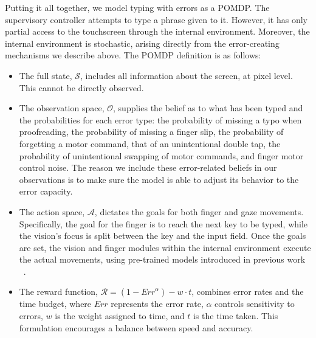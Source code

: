 Putting it all together, we model typing with errors as a POMDP.
The supervisory controller attempts to type a phrase given to it.
However, it has only partial access to the touchscreen through the internal environment. 
Moreover, the internal environment is stochastic, arising directly from the error-creating mechanisms we describe above.
The POMDP definition is as follows:
\begin{itemize}
    \item The full state, $\mathcal{S}$, includes all information about the screen, at pixel level. This cannot be directly observed.
    \item The observation space, $\mathcal{O}$, supplies the belief as to what has been typed and the probabilities for each error type: the probability of missing a typo when proofreading, the probability of missing a finger slip, the probability of forgetting a motor command, that of an unintentional double tap, the probability of unintentional swapping of motor commands, and finger motor control noise. The reason we include these error-related beliefs in our observations is to make sure the model is able to adjust its behavior to the error capacity.
    \item The action space, $\mathcal{A}$, dictates the goals for both finger and gaze movements. Specifically, the goal for the finger is to reach the next key to be typed, while the vision's focus is split between the key and the input field. Once the goals are set, the vision and finger modules within the internal environment execute the actual movements, using pre-trained models introduced in previous work ~\cite{shi2024crtypist}.
    \item The reward function, $\mathcal{R} = (1 - \textit{Err}^{\alpha}) - w \cdot t$, combines error rates and the time budget, where $\textit{Err}$ represents the error rate, $\alpha$ controls sensitivity to errors, $w$ is the weight assigned to time, and $t$ is the time taken. This formulation encourages a balance between speed and accuracy.
\end{itemize}


\subsection{}

